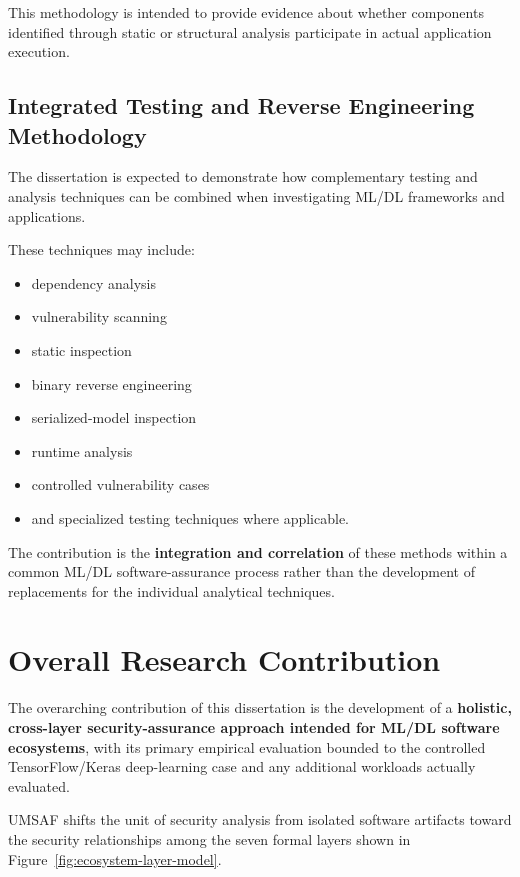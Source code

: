 \documentclass[
  12pt,
  letterpaper,
  oneside]{report}
\providecommand{\tightlist}{%
  \setlength{\itemsep}{0pt}\setlength{\parskip}{0pt}}
\begin{document}
This methodology is intended to provide evidence about whether
components identified through static or structural analysis participate
in actual application execution.

\subsection{Integrated Testing and Reverse Engineering Methodology}\label{1255-integrated-testing-and-reverse-engineering-methodology}

The dissertation is expected to demonstrate how complementary testing
and analysis techniques can be combined when investigating ML/DL
frameworks and applications.

These techniques may include:

\begin{itemize}
\tightlist
\item
  dependency analysis
\item
  vulnerability scanning
\item
  static inspection
\item
  binary reverse engineering
\item
  serialized-model inspection
\item
  runtime analysis
\item
  controlled vulnerability cases
\item
  and specialized testing techniques where applicable.
\end{itemize}

The contribution is the \textbf{integration and correlation} of these
methods within a common ML/DL software-assurance process rather than the
development of replacements for the individual analytical techniques.

\section{Overall Research Contribution}\label{126-overall-research-contribution}

The overarching contribution of this dissertation is the development of
a \textbf{holistic, cross-layer security-assurance approach intended for
ML/DL software ecosystems}, with its primary empirical evaluation
bounded to the controlled TensorFlow/Keras deep-learning case and any
additional workloads actually evaluated.

UMSAF shifts the unit of security analysis from isolated software
artifacts toward the security relationships among the seven formal
layers shown in Figure~\ref{fig:ecosystem-layer-model}.
\end{document}
